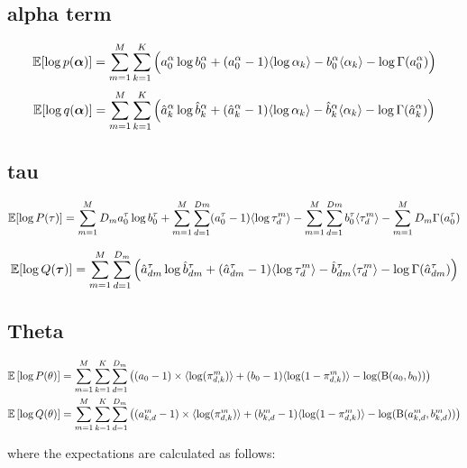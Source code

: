 \documentclass[10pt, a4paper,openany]{report}
\begin{document}
\subsection*{alpha term}
\[
\mathbb{E} [\log p(\mbox{\boldmath $\alpha$})] = \sum_{m=1}^{M}\sum_{k=1}^{K}\Big(a_0^\alpha\log b_0^\alpha +   (a_0^\alpha - 1) \langle \log \alpha_k \rangle - b_0^\alpha \langle \alpha_k \rangle - \log \Gamma(a_0^\alpha) \Big)
\]
\[
\mathbb{E} [\log q(\mbox{\boldmath $\alpha$})] = \sum_{m=1}^{M}\sum_{k=1}^{K} \Big( \hat{a}_{k}^\alpha \log \hat{b}_{k}^\alpha + (\hat{a}_{k}^\alpha - 1) \langle \log \alpha_k \rangle - \hat{b}_{k}^\alpha \langle \alpha_k \rangle - \log \Gamma(\hat{a}_{k}^\alpha) \Big)
\]

\subsection*{tau}
\[
\mathbb{E} [\log P(\tau)] = \sum_{m=1}^{M} D_m a_0^\tau \log b_0^\tau + \sum_{m=1}^{M}\sum_{d=1}^{Dm} (a_0^\tau - 1) \langle \log \tau_d^m \rangle - \sum_{m=1}^{M}\sum_{d=1}^{Dm} b_0^\tau \langle \tau_d^m \rangle - \sum_{m=1}^{M} D_m \Gamma(a_0^\tau)
\]

\[
\mathbb{E} [\log Q(\mbox{\boldmath $\tau$})] = \sum_{m=1}^{M}\sum_{d=1}^{D_m} \Big( \hat{a}_{dm}^\tau \log \hat{b}_{dm}^\tau + (\hat{a}_{dm}^\tau - 1) \langle \log \tau_d^m \rangle - \hat{b}_{dm}^\tau \langle \tau_d^m \rangle - \log \Gamma(\hat{a}_{dm}^\tau) \Big)
\]

\subsection*{Theta}
\begin{equation*}
    \begin{aligned}
      &\mathbb{E}\left[ \log P(\theta) \right] = \sum_{m=1}^M \sum_{k=1}^K\sum_{d=1}^{D_m}\left( (a_0 - 1) \times \langle \log(\pi^m_{d, k}) \rangle + (b_0 -1) \langle \log(1 - \pi^m_{d, k}) \rangle - \log (\mathrm{B} (a_0, b_0))\right) \\
      &\mathbb{E}\left[ \log Q(\theta) \right] = \sum_{m=1}^M \sum_{k=1}^K\sum_{d=1}^{D_m}\left( (a^m_{k,d} - 1) \times \langle \log(\pi^m_{d, k}) \rangle + (b^m_{k,d} -1) \langle \log(1 - \pi^m_{d, k}) \rangle - \log (\mathrm{B} (a^m_{k,d}, b^m_{k,d})) \right) \\
    \end{aligned}
\end{equation*}


where the expectations are calculated as follows:
\end{document}
